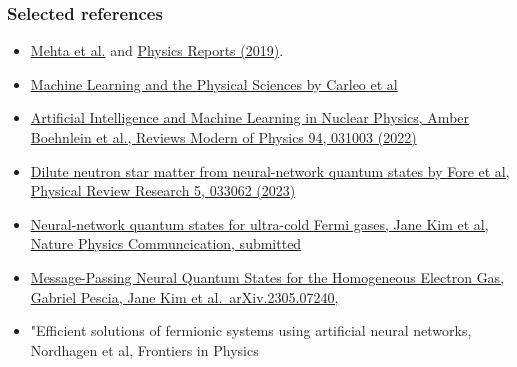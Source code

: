 \documentclass{beamer}
\begin{document}
\begin{frame}
\frametitle{Selected references}

\begin{block}{}
\begin{itemize}
\item \href{{https://arxiv.org/abs/1803.08823}}{Mehta et al.} and \href{{https://www.sciencedirect.com/science/article/pii/S0370157319300766?via%3Dihub}}{Physics Reports (2019)}.

\item \href{{https://link.aps.org/doi/10.1103/RevModPhys.91.045002}}{Machine Learning and the Physical Sciences by Carleo et al}

\item \href{{https://journals.aps.org/rmp/abstract/10.1103/RevModPhys.94.031003}}{Artificial Intelligence and Machine Learning in Nuclear Physics, Amber Boehnlein et al., Reviews Modern of Physics 94, 031003 (2022)} 

\item \href{{https://journals.aps.org/prresearch/pdf/10.1103/PhysRevResearch.5.033062}}{Dilute neutron star matter from neural-network quantum states by Fore et al, Physical Review Research 5, 033062 (2023)}

\item \href{{https://doi.org/10.48550/arXiv.2305.08831}}{Neural-network quantum states for ultra-cold Fermi gases, Jane Kim et al, Nature Physics Communcication, submitted}

\item \href{{https://doi.org/10.48550/arXiv.2305.07240}}{Message-Passing Neural Quantum States for the Homogeneous Electron Gas, Gabriel Pescia, Jane Kim et al.~arXiv.2305.07240,}

\item "Efficient solutions of fermionic systems using artificial neural networks, Nordhagen et al, Frontiers in Physics
\end{itemize}

\noindent
\end{block}
\end{frame}
\end{document}
